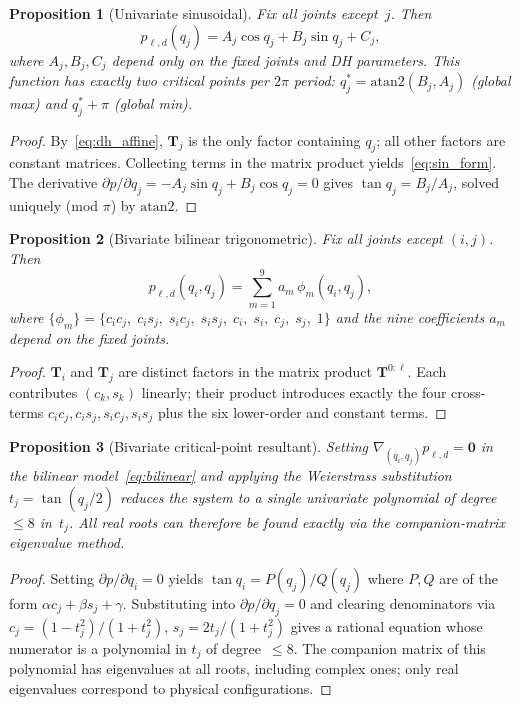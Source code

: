 \documentclass[journal]{IEEEtran}
\newtheorem{proposition}{Proposition}
\newcommand{\bT}{\mathbf{T}}
\begin{document}
\begin{proposition}[Univariate sinusoidal]\label{prop:sinusoid}
Fix all joints except~$j$.
Then
\begin{equation}\label{eq:sin_form}
  p_{\ell,d}(q_j)
  = A_j\cos q_j + B_j\sin q_j + C_j,
\end{equation}
where $A_j, B_j, C_j$ depend only on the fixed joints and
DH parameters.
This function has \emph{exactly two} critical points per $2\pi$
period: $q_j^* = \mathrm{atan2}(B_j,A_j)$ (global max)
and $q_j^* + \pi$ (global min).
\end{proposition}
\begin{proof}
By~\eqref{eq:dh_affine}, $\bT_j$ is the only factor containing
$q_j$; all other factors are constant matrices.
Collecting terms in the matrix product yields~\eqref{eq:sin_form}.
The derivative
$\partial p/\partial q_j = -A_j\sin q_j + B_j\cos q_j = 0$
gives $\tan q_j = B_j/A_j$, solved uniquely (mod $\pi$) by $\mathrm{atan2}$.
\end{proof}

\begin{proposition}[Bivariate bilinear trigonometric]\label{prop:bilinear}
Fix all joints except $(i,j)$.
Then
\begin{equation}\label{eq:bilinear}
  p_{\ell,d}(q_i,q_j) = \sum_{m=1}^{9} a_m\,\phi_m(q_i,q_j),
\end{equation}
where $\{\phi_m\} = \{c_i c_j,\; c_i s_j,\; s_i c_j,\; s_i s_j,\;
c_i,\; s_i,\; c_j,\; s_j,\; 1\}$ and the nine coefficients $a_m$
depend on the fixed joints.
\end{proposition}
\begin{proof}
$\bT_i$ and $\bT_j$ are distinct factors in the matrix product
$\bT^{0:\ell}$.
Each contributes $(c_k, s_k)$ linearly; their product introduces
exactly the four cross-terms $c_i c_j, c_i s_j, s_i c_j, s_i s_j$
plus the six lower-order and constant terms.
\end{proof}

\begin{proposition}[Bivariate critical-point resultant]\label{prop:resultant}
Setting $\nabla_{(q_i,q_j)} p_{\ell,d} = \bm{0}$ in the bilinear
model~\eqref{eq:bilinear} and applying the Weierstrass substitution
$t_j = \tan(q_j/2)$ reduces the system to a single univariate
polynomial of degree~$\leq 8$ in~$t_j$.
All real roots can therefore be found exactly via the companion-matrix
eigenvalue method.
\end{proposition}
\begin{proof}
Setting $\partial p / \partial q_i = 0$ yields
$\tan q_i = P(q_j) / Q(q_j)$ where $P,Q$ are of the
form $\alpha c_j + \beta s_j + \gamma$.
Substituting into $\partial p / \partial q_j = 0$ and clearing
denominators via $c_j = (1-t_j^2)/(1+t_j^2)$,
$s_j = 2t_j/(1+t_j^2)$ gives a rational equation whose numerator
is a polynomial in $t_j$ of degree~$\leq 8$.
The companion matrix of this polynomial has eigenvalues at all roots,
including complex ones; only real eigenvalues correspond to
physical configurations.
\end{proof}
\end{document}
